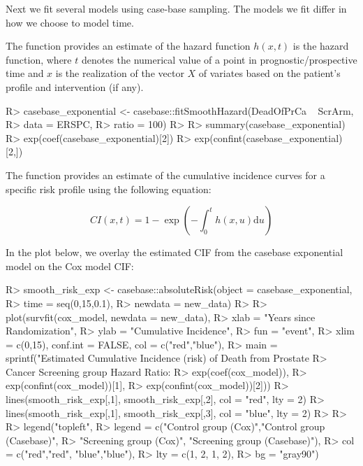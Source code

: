 \documentclass[
]{jss}
\begin{document}
Next we fit several models using case-base sampling. The models we fit
differ in how we choose to model time.

The  function provides an estimate of the hazard
function \(h(x, t)\) is the hazard function, where \(t\) denotes the
numerical value of a point in prognostic/prospective time and \(x\) is
the realization of the vector \(X\) of variates based on the patient's
profile and intervention (if any).

\begin{CodeChunk}

\begin{CodeInput}
R> casebase_exponential <- casebase::fitSmoothHazard(DeadOfPrCa ~ ScrArm, 
R>                                                   data = ERSPC, 
R>                                                   ratio = 100)
R> 
R> summary(casebase_exponential)
R> exp(coef(casebase_exponential)[2])
R> exp(confint(casebase_exponential)[2,])
\end{CodeInput}
\end{CodeChunk}

The  function provides an estimate of the cumulative
incidence curves for a specific risk profile using the following
equation:

\[ CI(x, t) = 1 - \exp\left( - \int_0^t h(x, u) \textrm{d}u \right) \]

In the plot below, we overlay the estimated CIF from the casebase
exponential model on the Cox model CIF:

\begin{CodeChunk}

\begin{CodeInput}
R> smooth_risk_exp <- casebase::absoluteRisk(object = casebase_exponential, 
R>                                           time = seq(0,15,0.1), 
R>                                           newdata = new_data)
R> 
R> plot(survfit(cox_model, newdata = new_data),
R>      xlab = "Years since Randomization", 
R>      ylab = "Cumulative Incidence", 
R>      fun = "event",
R>      xlim = c(0,15), conf.int = FALSE, col = c("red","blue"), 
R>      main = sprintf("Estimated Cumulative Incidence (risk) of Death from Prostate 
R>                     Cancer Screening group Hazard Ratio: %
R>                     exp(coef(cox_model)), 
R>                     exp(confint(cox_model))[1], 
R>                     exp(confint(cox_model))[2]))
R> lines(smooth_risk_exp[,1], smooth_risk_exp[,2], col = "red", lty = 2)
R> lines(smooth_risk_exp[,1], smooth_risk_exp[,3], col = "blue", lty = 2)
R> 
R> 
R> legend("topleft", 
R>        legend = c("Control group (Cox)","Control group (Casebase)",
R>                   "Screening group (Cox)", "Screening group (Casebase)"), 
R>        col = c("red","red", "blue","blue"),
R>        lty = c(1, 2, 1, 2), 
R>        bg = "gray90")
\end{CodeInput}
\end{CodeChunk}
\end{document}

